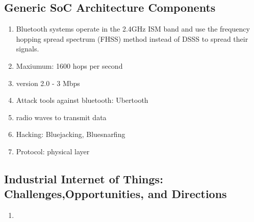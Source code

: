 \documentclass[../../../main.tex]{subfiles}
\begin{document}
\subsection{Generic SoC Architecture Components}
\begin{enumerate}
    \item Bluetooth systems operate in the 2.4GHz ISM band and use the frequency hopping spread spectrum (FHSS) method instead of DSSS to spread their signals.
    \item Maxiumum: 1600 hops per second
    \item version 2.0 - 3 Mbps
    \item Attack tools against bluetooth: Ubertooth
    \item radio waves to transmit data
    \item Hacking: Bluejacking, Bluesnarfing
    \item Protocol: physical layer
\end{enumerate}
\subsection{Industrial Internet of Things: Challenges,Opportunities, and Directions}
\begin{enumerate}
    \item 
\end{enumerate}
\end{document}
